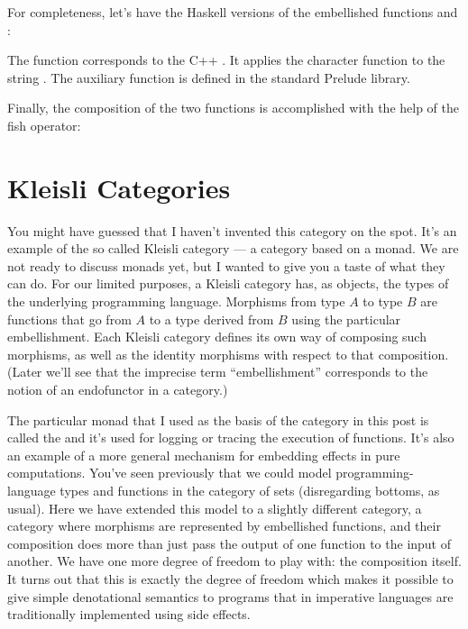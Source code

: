 For completeness, let's have the Haskell versions of the embellished
functions  and :

The function  corresponds to the C++ . It
applies the character function  to the string
. The auxiliary function  is defined in the
standard Prelude library.

Finally, the composition of the two functions is accomplished with the
help of the fish operator:


\section{Kleisli Categories}

You might have guessed that I haven't invented this category on the
spot. It's an example of the so called Kleisli category --- a category
based on a monad. We are not ready to discuss monads yet, but I wanted
to give you a taste of what they can do. For our limited purposes, a
Kleisli category has, as objects, the types of the underlying
programming language. Morphisms from type $A$ to type $B$ are functions that
go from $A$ to a type derived from $B$ using the particular embellishment.
Each Kleisli category defines its own way of composing such morphisms,
as well as the identity morphisms with respect to that composition.
(Later we'll see that the imprecise term ``embellishment'' corresponds
to the notion of an endofunctor in a category.)

The particular monad that I used as the basis of the category in this
post is called the  and it's used for logging or
tracing the execution of functions. It's also an example of a more
general mechanism for embedding effects in pure computations. You've
seen previously that we could model programming-language types and
functions in the category of sets (disregarding bottoms, as usual). Here
we have extended this model to a slightly different category, a category
where morphisms are represented by embellished functions, and their
composition does more than just pass the output of one function to the
input of another. We have one more degree of freedom to play with: the
composition itself. It turns out that this is exactly the degree of
freedom which makes it possible to give simple denotational semantics to
programs that in imperative languages are traditionally implemented
using side effects.

